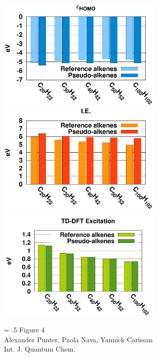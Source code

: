 \documentclass[12pt]{article}
\begin{document}
\begin{figure}
\begin{center}
\includegraphics[width=8cm]{long_pbe0_homo_uhf}\\
\includegraphics[width=8cm]{long_pbe0_ie_uhf}\\
\includegraphics[width=8cm]{long_pbe0_tddft}
\end{center}
{\Large
\begin{minipage}[t]{3in}
\baselineskip = .5\baselineskip
Figure 4 \\
Alexander Punter, Paola Nava, Yannick Carissan\\
Int. J. Quantum Chem.
\end{minipage}
}
\end{figure}

\clearpage
\end{document}
